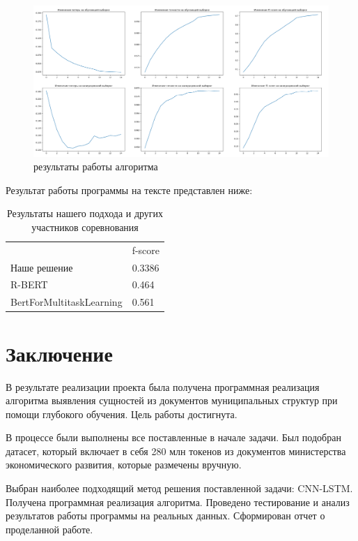 \documentclass{article}
\begin{document}
\begin{figure}[!tbh]
    \centering
    \includegraphics[width=0.9\linewidth]{res.png}
    \caption{результаты работы алгоритма}
    \label{fig:circle}
\end{figure}

Результат работы программы на тексте представлен ниже: 

\begin{table}[tbh!]
    \centering
    \begin{tabular}[t]{l|l}
         &  f-score\\
        Наше решение & 0.3386\\
        R-BERT & 0.464 \\
        BertForMultitaskLearning & 0.561 \\
    \end{tabular}
    \caption{Результаты нашего подхода и других участников соревнования}
    \label{tab:результаты нашего подхода и других участников соревнования}
\end{table}


\section{Заключение}
В результате реализации проекта была получена программная реализация алгоритма выявления сущностей из документов муниципальных структур при помощи глубокого обучения. Цель работы достигнута. 

В процессе были выполнены все поставленные в начале задачи.  Был подобран датасет, который включает в себя 280 млн токенов из документов министерства экономического развития, которые размечены вручную.

 Выбран наиболее подходящий метод решения поставленной задачи: CNN-LSTM.
Получена программная реализация алгоритма. Проведено тестирование и анализ результатов работы программы на реальных данных. Сформирован отчет о проделанной работе.


\end{document}
